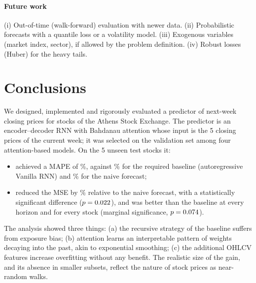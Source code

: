 \paragraph{Future work}
(i) Out-of-time (walk-forward) evaluation with newer data. (ii) Probabilistic forecasts with a quantile loss or a volatility model. (iii) Exogenous variables (market index, sector), if allowed by the problem definition. (iv) Robust losses (Huber) for the heavy tails.

\section{Conclusions}
We designed, implemented and rigorously evaluated a predictor of next-week closing prices for stocks of the Athens Stock Exchange. The predictor is an encoder--decoder RNN with Bahdanau attention whose input is the 5 closing prices of the current week; it was selected on the validation set among four attention-based models. On the 5 unseen test stocks it:
\begin{itemize}[leftmargin=*]
  \item achieved a MAPE of \PropMAPE\%, against \VrnnMAPE\% for the required baseline (autoregressive Vanilla RNN) and \PersMAPE\% for the naive forecast;
  \item reduced the MSE by \PropGain\% relative to the naive forecast, with a statistically significant difference ($p=0.022$), and was better than the baseline at every horizon and for every stock (marginal significance, $p=0.074$).
\end{itemize}
The analysis showed three things: (a) the recursive strategy of the baseline suffers from exposure bias; (b) attention learns an interpretable pattern of weights decaying into the past, akin to exponential smoothing; (c) the additional OHLCV features increase overfitting without any benefit. The realistic size of the gain, and its absence in smaller subsets, reflect the nature of stock prices as near-random walks.
